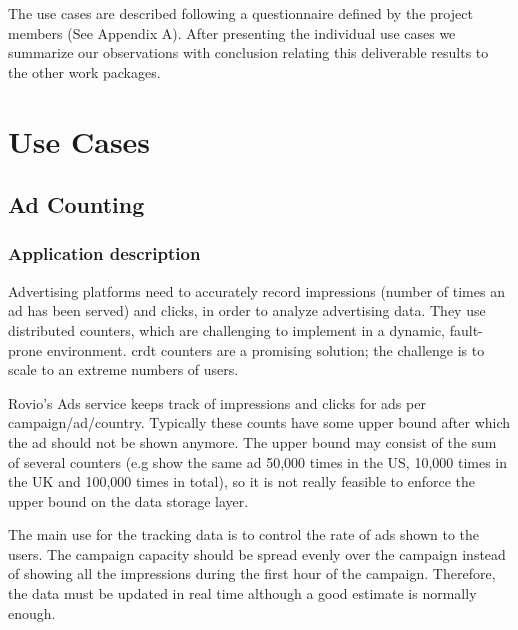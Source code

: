 \documentclass[11pt,a4paper]{report}
\begin{document}
The use cases are described following a questionnaire defined
by the project members (See Appendix A).
After presenting the individual use cases we summarize our
observations with conclusion relating this deliverable results to the
other work packages.

\chapter{Use Cases}
\section{Ad Counting}
\subsection{Application description}
Advertising platforms need to accurately record impressions (number of times an ad has been served) and clicks, in order to analyze advertising data. They use distributed counters, which are challenging to implement in a dynamic, fault-prone environment. \gls{crdt} counters are a promising solution; the challenge is to scale to an extreme numbers of users. 
 
Rovio's Ads service keeps track of impressions and clicks for ads per campaign/ad/country. Typically these counts have some upper bound  after which the ad should not be shown anymore. The upper bound may consist of the sum of several counters (e.g show the same ad 50,000 times in the US, 10,000 times in the UK and 100,000 times in total), so it is not really feasible to enforce the upper bound on the data storage layer.

The main use for the tracking data is to control the rate of ads shown to the users. The campaign capacity should be spread evenly over the campaign instead of showing all the impressions during the first hour of the campaign. Therefore, the data must be updated in real time although a good estimate is normally enough.
\end{document}

